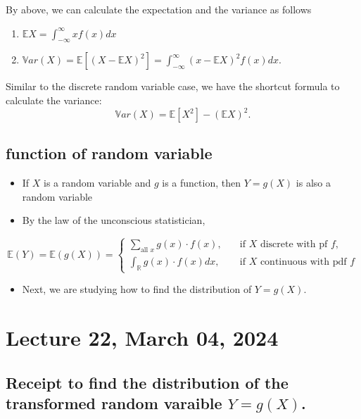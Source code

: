 \documentclass[
]{book}
\providecommand{\tightlist}{%
  \setlength{\itemsep}{0pt}\setlength{\parskip}{0pt}}
\theoremstyle{definition}
\theoremstyle{definition}
\theoremstyle{definition}
\theoremstyle{definition}
\theoremstyle{remark}
\begin{document}
By above, we can calculate the expectation and the variance as follows

\begin{enumerate}
\def\labelenumi{\arabic{enumi}.}
\item
  \(\mathbb{E}X = \int_{-\infty}^\infty x f(x) dx\)
\item
  \(\mathbb{V}ar(X) = \mathbb{E}[(X-\mathbb{E}X)^2] = \int_{-\infty}^\infty (x-\mathbb{E}X)^2 f(x)dx\).
\end{enumerate}

Similar to the discrete random variable case, we have the shortcut formula to calculate the variance:
\[
  \mathbb{V}ar(X) = \mathbb{E}[X^2] - (\mathbb{E}X)^2.
\]

\section{function of random variable}\label{function-of-random-variable}

\begin{itemize}
\tightlist
\item
  If \(X\) is a random variable and \(g\) is a function, then \(Y=g(X)\) is also a random variable
\item
  By the law of the unconscious statistician,
\end{itemize}

\[ \mathbb{E}(Y)=\mathbb{E}(g(X)) = \begin{cases} \sum_{\text{all }x} g(x)\cdot f(x),\quad&\text{if $X$ discrete with pf }f,\\
\int_{\mathbb{R}} g(x)\cdot f(x)dx,\quad&\text{if $X$ continuous with pdf }f\end{cases}
\]

\begin{itemize}
\tightlist
\item
  Next, we are studying how to find the distribution of \(Y=g(X)\).
\end{itemize}

\chapter{Lecture 22, March 04, 2024}\label{lecture-22-march-04-2024}

\newcommand{\var}{\mathbb{V}ar}
\newcommand{\R}{\mathbb{R}}
\newcommand{\E}{\mathbb{E}}

\section{\texorpdfstring{Receipt to find the distribution of the transformed random varaible \(Y=g(X)\).}{Receipt to find the distribution of the transformed random varaible Y=g(X).}}\label{receipt-to-find-the-distribution-of-the-transformed-random-varaible-ygx.}
\end{document}
